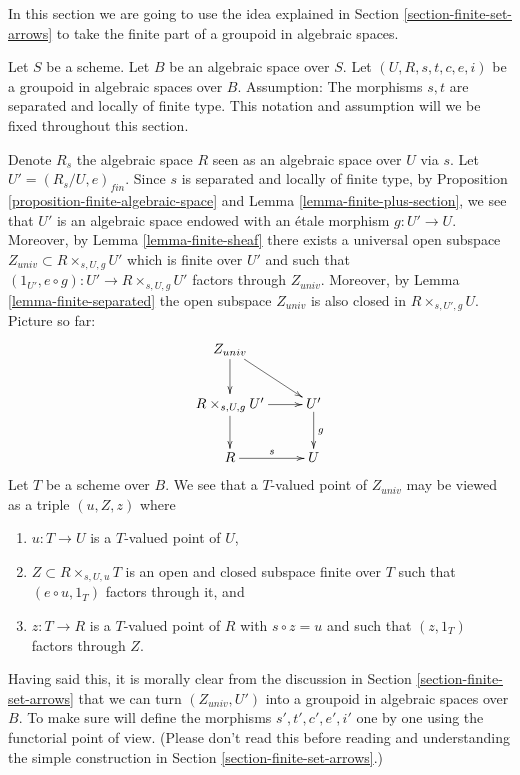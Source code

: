 \documentclass{stacks-project}
\theoremstyle{plain}
\theoremstyle{definition}
\theoremstyle{remark}
\numberwithin{equation}{subsection}
\begin{document}
\noindent
In this section we are going to use the idea explained in
Section \ref{section-finite-set-arrows}
to take the finite part of a groupoid in algebraic spaces.

\medskip\noindent
Let $S$ be a scheme.
Let $B$ be an algebraic space over $S$.
Let $(U, R, s, t, c, e, i)$ be a groupoid in algebraic spaces over $B$.
Assumption: The morphisms $s, t$ are separated and locally of finite type.
This notation and assumption will we be fixed throughout this section.

\medskip\noindent
Denote $R_s$ the algebraic space $R$ seen as an
algebraic space over $U$ via $s$. Let
$U' = (R_s/U, e)_{fin}$. Since $s$ is separated and locally of
finite type, by
Proposition \ref{proposition-finite-algebraic-space} and
Lemma \ref{lemma-finite-plus-section},
we see that $U'$ is an algebraic space endowed with an \'etale morphism
$g : U' \to U$. Moreover, by
Lemma \ref{lemma-finite-sheaf}
there exists a universal open subspace
$Z_{univ} \subset R \times_{s, U, g} U'$ which is finite over $U'$
and such that $(1_{U'}, e \circ g) : U' \to R \times_{s, U, g} U'$
factors through $Z_{univ}$. Moreover, by
Lemma \ref{lemma-finite-separated}
the open subspace $Z_{univ}$ is also closed in $R \times_{s, U', g} U$.
Picture so far:
$$
\xymatrix{
Z_{univ} \ar[d] \ar[rd] & \\
R \times_{s, U, g} U' \ar[d] \ar[r] & U' \ar[d]^g \\
R \ar[r]^s & U
}
$$
Let $T$ be a scheme over $B$. We see that a $T$-valued point of
$Z_{univ}$ may be viewed as a triple $(u, Z, z)$ where
\begin{enumerate}
\item $u : T \to U$ is a $T$-valued point of $U$,
\item $Z \subset R \times_{s, U, u} T$ is an open and closed subspace
finite over $T$ such that $(e \circ u, 1_T)$ factors through it, and
\item $z : T \to R$ is a $T$-valued point of $R$ with $s \circ z = u$
and such that $(z, 1_T)$ factors through $Z$.
\end{enumerate}
Having said this, it is morally clear from the discussion in
Section \ref{section-finite-set-arrows}
that we can turn $(Z_{univ}, U')$ into a groupoid in algebraic spaces
over $B$. To make sure will define the morphisms $s', t', c', e', i'$
one by one using the functorial point of view. (Please don't read this
before reading and understanding the simple construction in
Section \ref{section-finite-set-arrows}.)
\end{document}
